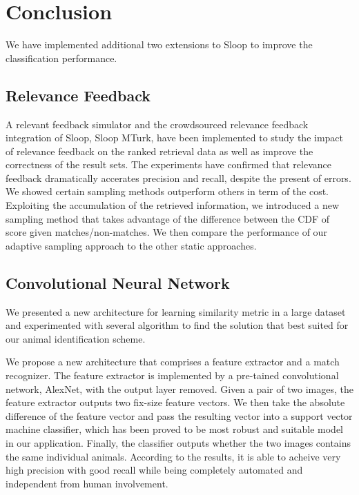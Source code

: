 \chapter{Conclusion}

We have implemented additional two extensions to Sloop to improve the
classification performance.

\section{Relevance Feedback} A relevant feedback simulator and the crowdsourced
relevance feedback integration of Sloop, Sloop MTurk, have been implemented to
study the impact of relevance feedback on the ranked retrieval data as well as
improve the correctness of the result sets. The experiments have confirmed that
relevance feedback dramatically accerates precision and recall, despite the
present of errors. We showed certain sampling methods outperform others in term
of the cost. Exploiting the accumulation of the retrieved information, we
introduced a new sampling method that takes advantage of the difference between
the CDF of score given matches/non-matches. We then compare the performance of
our adaptive sampling approach to the other static  approaches.

\section{Convolutional Neural Network}

We presented a new architecture for learning similarity metric in a large
dataset and experimented with several algorithm to find the solution that best
suited for our animal identification scheme. 

We propose a new architecture that comprises a feature extractor and a match
recognizer. The feature extractor is implemented by a pre-tained convolutional
network, AlexNet, with the output layer removed. Given a pair of two images,
the feature extractor outputs two fix-size feature vectors. We then take the
absolute difference of the feature vector and pass the resulting vector into a
support vector machine classifier, which has been proved to be most robust and
suitable model in our application. Finally, the classifier outputs whether the
two images contains the same individual animals. According to the results, it
is able to acheive very high precision with good recall while being completely
automated and independent from human involvement. 

